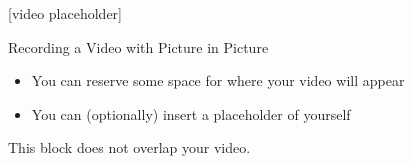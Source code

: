 \documentclass[english,aspectratio=169,t,9pt]{beamer}
\begin{document}
\activatevideospacing
{}[video placeholder]

\begin{frame}{Recording a Video with Picture in Picture}
	\begin{itemize}
	\item You can reserve some space for where your video will appear
	\item You can (optionally) insert a placeholder of yourself
	\end{itemize}

	\pushdown

	\begin{videospacing}
	\begin{block}{}
		\medskip
		\centering
		This block does not overlap your video.
		\medskip
	\end{block}
	\end{videospacing}
\end{frame}
\end{document}
